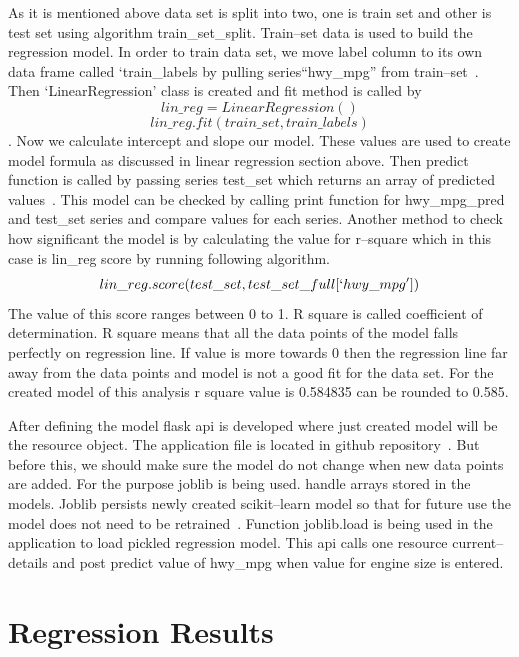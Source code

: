  As it is mentioned above data set is split into two, one is train
 set and other is test set using algorithm train\_set\_split. 
 Train--set data is used to build the regression
 model. In order to train data set, we move label column to its own data frame
 called `train\_labels by pulling  series``hwy\_mpg'' from 
 train--set~\cite{hid-sp18-415-regression}. Then `LinearRegression' 
 class is created and fit 
 method is called by \[lin\_reg = LinearRegression()\] 
 \[lin\_reg.fit(train\_set, train\_labels)\]. Now we calculate intercept and
 slope our model. These values are used to create model formula
 as discussed in linear regression section above. Then predict function is
  called  by passing series test\_set which returns an array of predicted 
  values~\cite{hid-sp18-415-regression}. This model can be checked by calling
  print function for hwy\_mpg\_pred
  and test\_set series and compare values for each series. Another method to
  check how significant the model is by calculating the value for r--square 
  which in this case is lin\_reg score by running following algorithm.  
  \[lin\_reg.score(test\_set, test\_set\_full[`hwy\_mpg'])\]
  The value of this score ranges between 0 to 1. R square is called coefficient
  of determination. R square means that all the data points of the model falls
  perfectly on regression line. If value is more towards 0 then the regression 
  line far away from the data points and model is not a good fit for the data
  set. For the created model of this analysis r square value is 
  0.584835 can be rounded to 0.585.
  
  After defining the model flask api is developed where just created model will 
  be the resource object. The application file is located in github 
  repository~\cite{hid-sp18-415-regressionapi}. But before this,
  we should make sure the model do not 
  change when new data points are added. For the purpose joblib is being used.
  handle arrays stored in the models. Joblib persists newly created
  scikit--learn model so that for future use the model does not need to be
  retrained~\cite{hid-sp18-415-joblib}. Function joblib.load is being used in
  the application to load pickled regression model. This api calls one resource 
  current--details  and post predict value of hwy\_mpg when value for engine
  size is entered. 
   
  
\section{Regression Results}

